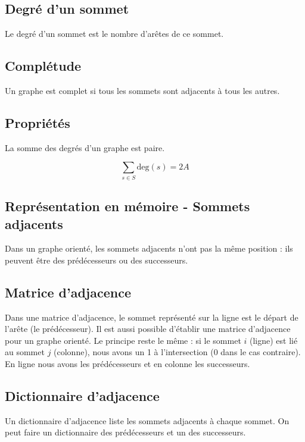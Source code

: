 \documentclass{article}
\begin{document}
\subsection{Degré d’un sommet}
Le degré d’un sommet est le nombre d’arêtes de ce sommet.

\subsection{Complétude}
Un graphe est complet si tous les sommets sont adjacents à tous les autres.

\subsection{Propriétés}
La somme des degrés d’un graphe est paire.

\[
\sum_{s \in S} \text{deg}(s) = 2A
\]

\subsection{Représentation en mémoire - Sommets adjacents}
Dans un graphe orienté, les sommets adjacents n’ont pas la même position : ils peuvent être des prédécesseurs ou des successeurs.

\subsection{Matrice d’adjacence}
Dans une matrice d’adjacence, le sommet représenté sur la ligne est le départ de l’arête (le prédécesseur).  
Il est aussi possible d'établir une matrice d'adjacence pour un graphe orienté. Le principe reste le même : si le sommet $i$ (ligne) est lié au sommet $j$ (colonne), nous avons un 1 à l'intersection (0 dans le cas contraire).  
En ligne nous avons les prédécesseurs et en colonne les successeurs.

\subsection{Dictionnaire d’adjacence}
Un dictionnaire d’adjacence liste les sommets adjacents à chaque sommet. On peut faire un dictionnaire des prédécesseurs et un des successeurs.
\end{document}

